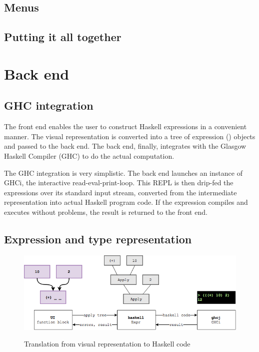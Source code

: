 \subsection{Menus}
\subsection{Putting it all together}


\section{Back end}

\subsection{GHC integration}

The front end enables the user to construct Haskell expressions in a convenient manner.
The visual representation is converted into a tree of expression () objects and passed to the back end. 
The back end, finally, integrates with the Glasgow Haskell Compiler (\gls{GHC}) to do the actual computation.

The GHC integration is very simplistic.
The back end launches an instance of GHCi, the interactive read-eval-print-loop. 
This \gls{REPL} is then drip-fed the expressions over its standard input stream, converted from the intermediate representation into actual Haskell program code.
If the expression compiles and executes without problems, the result is returned to the front end.

\subsection{Expression and type representation}

\begin{figure}[h]
	\centering
	\includegraphics[scale=0.5]{Images/exprtohaskell}
	\label{fig:classdiagram-expr}
	\caption{Translation from visual representation to Haskell code}
\end{figure}

